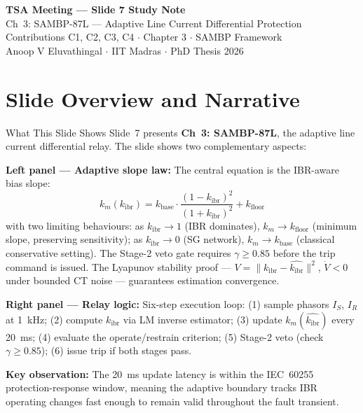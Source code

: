 \documentclass[12pt,a4paper]{article}
\newcommand{\kibr}{k_\mathrm{ibr}}
\newcommand{\km}{k_m}
\newcommand{\kbase}{k_\mathrm{base}}
\newcommand{\kfloor}{k_\mathrm{floor}}
\begin{document}
\begin{tcolorbox}[colback=iitmnavy,coltext=white,arc=4pt,boxrule=0pt]
\begin{center}
  {\Large\bfseries TSA Meeting --- Slide 7 Study Note}\\[4pt]
  {\large Ch~3: SAMBP-87L --- Adaptive Line Current Differential Protection}\\[6pt]
  {\normalsize Contributions C1, C2, C3, C4 $\cdot$ Chapter 3 $\cdot$ SAMBP Framework}\\[2pt]
  {\small Anoop V Eluvathingal $\cdot$ IIT Madras $\cdot$ PhD Thesis 2026}
\end{center}
\end{tcolorbox}

\vspace{6pt}

\section{Slide Overview and Narrative}

\begin{keybox}{What This Slide Shows}
Slide~7 presents \textbf{Ch~3: SAMBP-87L}, the adaptive line current differential relay. The slide shows two complementary aspects:

\textbf{Left panel --- Adaptive slope law:} The central equation is the IBR-aware bias slope:
\[
  \km(\kibr) = \kbase \cdot \frac{(1-\kibr)^2}{(1+\kibr)^2} + \kfloor
\]
with two limiting behaviours: as $\kibr \to 1$ (IBR dominates), $\km \to \kfloor$ (minimum slope, preserving sensitivity); as $\kibr \to 0$ (SG network), $\km \to \kbase$ (classical conservative setting). The Stage-2 veto gate requires $\gamma \geq 0.85$ before the trip command is issued. The Lyapunov stability proof --- $V = \|\kibr - \hat{\kibr}\|^2$, $\dot{V} < 0$ under bounded CT noise --- guarantees estimation convergence.

\textbf{Right panel --- Relay logic:} Six-step execution loop: (1) sample phasors $I_S$, $I_R$ at 1~kHz; (2) compute $\kibr$ via LM inverse estimator; (3) update $\km(\hat{\kibr})$ every 20~ms; (4) evaluate the operate/restrain criterion; (5) Stage-2 veto (check $\gamma \geq 0.85$); (6) issue trip if both stages pass.

\textbf{Key observation:} The 20~ms update latency is within the IEC~60255 protection-response window, meaning the adaptive boundary tracks IBR operating changes fast enough to remain valid throughout the fault transient.
\end{keybox}
\end{document}
